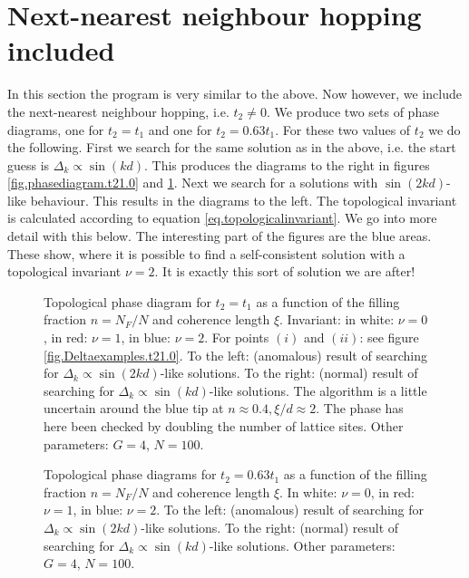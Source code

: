 \section{Next-nearest neighbour hopping included}
\label{sec.NNNincluded} 
In this section the program is very similar to the above. Now however, we include the next-nearest neighbour hopping, i.e. $t_2 \neq 0$. We produce two sets of phase diagrams, one for $t_2 = t_1$ and one for $t_2 = 0.63t_1$. For these two values of $t_2$ we do the following. First we search for the same solution as in the above, i.e. the start guess is $\Delta_k \propto \sin(kd)$. This produces the diagrams to the right in figures \ref{fig.phasediagram.t21.0} and \ref{fig.phasediagram.t20.63}. Next we search for a solutions with $\sin(2kd)$-like behaviour. This results in the diagrams to the left. The topological invariant is calculated according to equation \eqref{eq.topologicalinvariant}. We go into more detail with this below. The interesting part of the figures are the blue areas. These show, where it is possible to find a self-consistent solution with a topological invariant $\nu = 2$. It is exactly this sort of solution we are after! 

\begin{figure}
\begin{center}

\caption{Topological phase diagram for $t_2 = t_1$ as a function of the filling fraction $n = N_F/N$ and coherence length $\xi$. Invariant: in white: $\nu = 0$, in red: $\nu = 1$, in blue: $\nu = 2$. For points $(i)$ and $(ii)$: see figure \ref{fig.Deltaexamples.t21.0}. To the left: (anomalous) result of searching for $\Delta_k\propto \sin(2kd)$-like solutions. To the right: (normal) result of searching for $\Delta_k \propto \sin(kd)$-like solutions. The algorithm is a little uncertain around the blue tip at $n \approx 0.4, \xi / d \approx 2$. The phase has here been checked by doubling the number of lattice sites. Other parameters: $G = 4$, $N = 100$. }
\label{fig.phasediagram.t21.0}
\vspace{0.5cm}

\caption{Topological phase diagrams for $t_2 = 0.63t_1$ as a function of the filling fraction $n = N_F/N$ and coherence length $\xi$. In white: $\nu = 0$, in red: $\nu = 1$, in blue: $\nu = 2$. To the left: (anomalous) result of searching for $\Delta_k\propto \sin(2kd)$-like solutions. To the right: (normal) result of searching for $\Delta_k \propto \sin(kd)$-like solutions. Other parameters: $G = 4$, $N = 100$. }
\label{fig.phasediagram.t20.63}
\end{center}
\end{figure}


